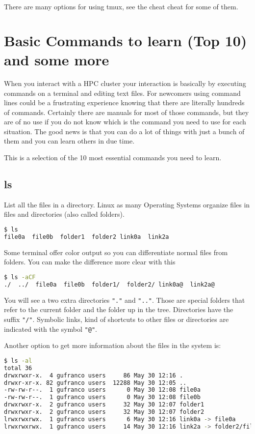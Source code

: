 There are many options for using tmux, see the cheat cheat for some of them.

\section{Basic Commands to learn (Top 10) and some more}

When you interact with a HPC cluster your interaction is basically by executing commands on a terminal and editing text files. For newcomers using command lines could be a frustrating experience knowing that there are literally hundreds of commands. Certainly there are manuals for most of those commands, but they are of no use if you do not know which is the command you need to use for each situation. The good news is that you can do a lot of things with just a bunch of them and you can learn others in due time.

This is a selection of the 10 most essential commands you need to learn.

\subsection{ls}

List all the files in a directory. Linux as many Operating Systems organize files in files and directories (also called folders). 

\begin{lstlisting}[language=bash]
$ ls
file0a  file0b  folder1  folder2 link0a  link2a
\end{lstlisting}

Some terminal offer color output so you can differentiate normal files from folders. You can make the difference more clear with this

\begin{lstlisting}[language=bash]
$ ls -aCF
./  ../  file0a  file0b  folder1/  folder2/ link0a@  link2a@
\end{lstlisting}

You will see a two extra directories \texttt{"."} and \texttt{".."}. Those are special folders that refer to the current folder and the folder up in the tree.
Directories have the suffix \texttt{"/"}. Symbolic links, kind of shortcuts to other files or directories are indicated with the symbol \texttt{"@"}.

Another option to get more information about the files in the system is:

\begin{lstlisting}[language=bash]
$ ls -al
total 36
drwxrwxr-x.  4 gufranco users     86 May 30 12:16 .
drwxr-xr-x. 82 gufranco users  12288 May 30 12:05 ..
-rw-rw-r--.  1 gufranco users      0 May 30 12:08 file0a
-rw-rw-r--.  1 gufranco users      0 May 30 12:08 file0b
drwxrwxr-x.  2 gufranco users     32 May 30 12:07 folder1
drwxrwxr-x.  2 gufranco users     32 May 30 12:07 folder2
lrwxrwxrwx.  1 gufranco users      6 May 30 12:16 link0a -> file0a
lrwxrwxrwx.  1 gufranco users     14 May 30 12:16 link2a -> folder2/file2a
\end{lstlisting}


